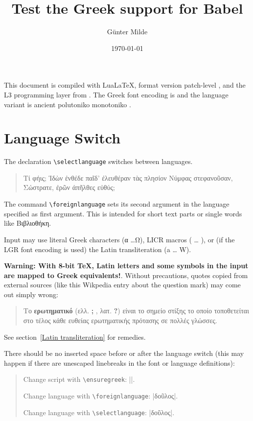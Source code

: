 \documentclass[a4paper]{article}
\newcommand{\cs}[1]{\texttt{\textbackslash#1}}
\newcommand{\GreekLanguageVariant}{%
  \ifx\captionsgreek\captionspolutonikogreek
    \ifx\captionsgreek\captionsancientgreek
      ancient%
    \else
      polutoniko%
    \fi
  \else
    monotoniko%
  \fi
}
\newcommand*{\texengine}{LuaLaTeX}
\newcommand*{\texengine}{XeLaTeX}
\newcommand*{\texengine}{pdfLaTeX}
\begin{document}
\title{Test the Greek support for Babel}
\author{Günter Milde}
\date{\today}
\maketitle

\SETUPDOC %

\makeatletter
This document is compiled with \texengine,
format version \fmtversion{} patch-level \patch@level{},
and the L3 programming layer from \ExplFileDate{}.
The Greek font encoding is \greekfontencoding{}
and the language variant is \GreekLanguageVariant.
\makeatother


\tableofcontents


\section{Language Switch}

The declaration \verb|\selectlanguage| switches between languages.

\begin{quote}
  Τί φήις; Ἱδὼν ἐνθέδε παῖδ’ ἐλευθέραν
  τὰς πλησίον Νύμφας στεφανοῦσαν, Σώστρατε,
  ἐρῶν άπῆλθες εὐθύς;
\end{quote}

The command \verb|\foreignlanguage| sets its second argument in the language
specified as first argument. This is intended for short text parts or
single words like \foreignlanguage{greek}{Βιβλιοθήκη}.

Input may use literal Greek characters (\foreignlanguage{greek}{α \ldots Ω}),
LICR macros (\foreignlanguage{greek}{\textalpha{} \ldots{} \textOmega}),
or (if the LGR font encoding is used) the Latin transliteration
(\foreignlanguage{greek}{a \ldots{} W}).

\textbf{Warning: With 8-bit TeX, Latin letters and some symbols in the input
are mapped to Greek equivalents!}.
Without precautions, quotes copied from external sources (like this Wikpedia
entry about the question mark) may come out simply wrong:
\begin{quote}
  Το \textbf{ερωτηματικό} (ελλ. \textbf{;} , λατ. \textbf{?}) είναι το
  σημείο στίξης το οποίο τοποθετείται στο τέλος κάθε ευθείας ερωτηματικής
  πρότασης σε πολλές γλώσσες.
\end{quote}
See section~\ref{Latin transliteration} for remedies.

There should be no inserted space before or after the language switch (this
may happen if there are unescaped linebreaks in the font or language
definitions):
\begin{quotation}
  Change script with \cs{ensuregreek}: ||.

  Change language with \cs{foreignlanguage}:
                           |\foreignlanguage{greek}{δοῦλος}|.

  Change language with \cs{selectlanguage}:
                       |δοῦλος|.
\end{quotation}
\end{document}
